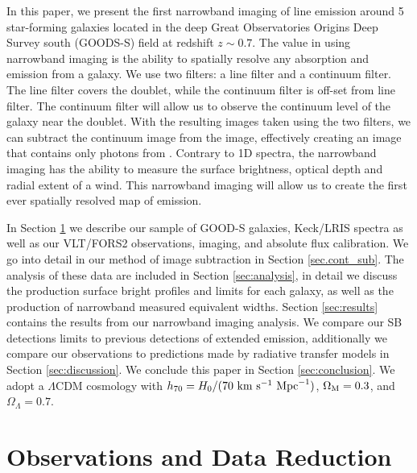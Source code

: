\documentclass[twocolumn]{aastex61}
\begin{document}
In this paper, we present the first narrowband imaging of  line emission around 5 star-forming  galaxies located in the deep Great Observatories Origins Deep Survey south (GOODS-S) field at redshift $z \sim 0.7$. The value in using narrowband imaging is the ability to spatially resolve any absorption and emission from a galaxy. We use two filters: a line filter and a continuum filter. The line filter covers the  doublet, while the continuum filter is off-set from line filter. The continuum filter will allow us to observe the continuum level of the galaxy near the  doublet. With the resulting images taken using the two filters, we can subtract the continuum image from the  image, effectively creating an image that contains only photons from . Contrary to 1D spectra, the narrowband imaging has the ability to measure the surface brightness, optical depth and radial extent of a wind. This narrowband imaging will allow us to create the first ever spatially resolved map of  emission. 

In Section \ref{sec:obs_red} we describe our sample of GOOD-S galaxies, Keck/LRIS spectra as well as our VLT/FORS2 observations, imaging, and absolute flux calibration. We go into detail in our method of image subtraction in Section \ref{sec.cont_sub}. The analysis of these data are included in Section \ref{sec:analysis}, in detail we discuss the production surface bright profiles and limits for each galaxy, as well as the production of narrowband measured equivalent widths. Section \ref{sec:results} contains the results from our narrowband imaging analysis. We compare our SB detections limits to previous detections of extended  emission, additionally we compare our observations to predictions made by radiative transfer models in Section \ref{sec:discussion}. We conclude this paper in Section \ref{sec:conclusion}.
We adopt a $\Lambda$CDM cosmology with $h_{70} = H_0/(70\ \rm{ km}\ \rm{ s}^{-1}\ \rm{ Mpc}^{-1})$, $\Omega_{\rm{M}}= 0.3$, and $\Omega_{\Lambda} = 0.7$.


\section{Observations and Data Reduction}\label{sec:obs_red}
\end{document}
